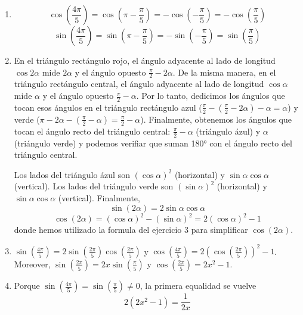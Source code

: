 \begin{enumerate}
\item
  $$\cos\left(\frac{4\pi}{5}\right) = \cos\left(\pi-\frac{\pi}{5}\right) =
  -\cos\left(-\frac{\pi}{5}\right) = -\cos\left(\frac{\pi}{5}\right)$$
  $$\sin\left(\frac{4\pi}{5}\right) = \sin\left(\pi-\frac{\pi}{5}\right) =
  -\sin\left(-\frac{\pi}{5}\right) = \sin\left(\frac{\pi}{5}\right)$$

\item En el triángulo rectángulo rojo, el ángulo adyacente al lado de longitud 
  $\cos 2\alpha$ mide $2\alpha$ y el ángulo opuesto $\frac{\pi}{2} - 2\alpha$.
  De la misma manera, en el triángulo rectángulo central, el ángulo adyacente
  al lado de longitud $\cos \alpha$ mide $\alpha$ y el ángulo opuesto
  $\frac{\pi}{2} - \alpha$. Por lo tanto, dedicimos los ángulos que tocan
  esos ángulos en el triángulo rectángulo azul ($\frac{\pi}{2} -
  \left(\frac{\pi}{2} - 2\alpha\right) - \alpha =
  \alpha$) y verde ($\pi - 2\alpha - \left(\frac{\pi}{2}-\alpha\right) =
  \frac{\pi}{2} - \alpha$).
  Finalmente, obtenemos los ángulos que tocan el ángulo recto del
  triángulo central: $\frac{\pi}{2} - \alpha$ (triángulo ázul) y $\alpha$
  (triángulo verde) y podemos verifiar que suman 180° con el ángulo recto
  del triángulo central.

  Los lados del triángulo ázul son $\left(\cos \alpha\right)^2$ (horizontal) y
  ${\sin \alpha} {\cos \alpha}$ (vertical). 
  Los lados del triángulo verde son $\left(\sin \alpha\right)^2$ (horizontal) y
  ${\sin \alpha} {\cos \alpha}$ (vertical). Finalmente,
  $${\sin \left(2\alpha\right)} = 2 {\sin \alpha} {\cos \alpha}$$
  $${\cos \left(2\alpha\right)} = \left(\cos \alpha\right)^2 - 
  \left(\sin \alpha\right)^2 = 
  2\left(\cos \alpha\right)^2 - 1$$
  donde hemos utilizado la formula del ejercicio 3 para simplificar
  $\cos \left(2\alpha\right)$.

\item 

${\sin \left(\frac{4\pi}{5}\right)} = 2 {\sin \left(\frac{2\pi}{5}\right)}
{\cos \left(\frac{2\pi}{5}\right)}$ y
${\cos \left(\frac{4\pi}{5}\right)} =
2 \left({\cos \left(\frac{2\pi}{5}\right)}\right)^2 - 1$. Moreover,
${\sin \left(\frac{2\pi}{5}\right)} = 2 x {\sin \left(\frac{\pi}{5}\right)}$ y
${\cos \left(\frac{2\pi}{5}\right)} = 2x^2 - 1$.

\item Porque
$\sin\left(\frac{4\pi}{5}\right) = \sin\left(\frac{\pi}{5}\right) \neq 0$,
la primera equalidad se vuelve
$$2 \left(2x^2-1\right) = \frac{1}{2x}$$


\end{enumerate}
